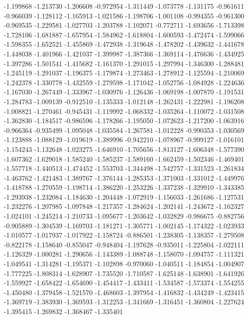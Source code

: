 -1.199868
-1.213730
-1.206608
-0.972954
-1.311449
-1.073778
-1.131175
-0.961611
-0.966039
-1.128112
-1.165913
-1.021586
-1.198706
-1.001108
-0.994355
-0.961300
-0.969535
-1.229581
-1.027703
-1.203788
-1.102071
-0.772711
-1.693656
-1.713398
-1.728106
-1.681887
-1.657954
-1.584962
-1.618804
-1.600593
-1.472474
-1.599066
-1.598355
-1.652521
-1.455869
-1.472938
-1.319648
-1.478202
-1.439632
-1.441678
-1.448038
-1.401966
-1.421037
-1.399987
-1.387366
-1.369114
-1.476636
-1.434925
-1.397286
-1.501541
-1.415682
-1.161370
-1.291015
-1.297994
-1.346300
-1.288481
-1.245119
-1.291037
-1.196375
-1.179874
-1.273463
-1.278912
-1.125594
-1.210069
-1.242378
-1.330778
-1.432559
-1.279598
-1.171042
-1.052756
-1.084928
-1.224636
-1.167030
-1.267449
-1.333967
-1.030976
-1.126436
-1.069198
-1.007870
-1.191531
-1.284783
-1.009139
-0.912510
-1.135333
-1.012148
-1.262431
-1.222981
-1.196208
-1.008821
-1.270461
-0.945431
-1.119992
-1.068332
-1.035264
-1.110072
-1.031508
-1.362830
-1.184517
-0.986596
-1.178266
-1.195050
-1.072623
-1.217200
-1.063916
-0.966364
-0.935499
-1.095048
-1.035584
-1.267581
-1.012228
-0.990353
-1.030569
-1.123888
-1.088129
-1.019619
-1.389996
-0.942210
-1.078967
-0.999127
-1.016101
-1.154243
-1.132648
-1.023275
-1.646910
-1.705656
-1.813127
-1.606348
-1.577390
-1.607362
-1.629018
-1.585240
-1.585237
-1.589160
-1.662459
-1.502346
-1.469401
-1.557718
-1.440513
-1.474452
-1.553703
-1.344498
-1.542757
-1.331523
-1.261834
-1.463762
-1.421483
-1.389767
-1.376144
-1.285353
-1.371003
-1.331012
-1.449976
-1.418788
-1.270559
-1.198714
-1.386220
-1.253226
-1.337238
-1.329910
-1.343385
-1.293938
-1.232084
-1.184630
-1.204448
-1.072919
-1.156033
-1.261686
-1.127531
-1.232276
-1.207985
-1.097848
-1.217357
-1.284624
-1.202141
-1.243672
-1.162327
-1.024101
-1.245214
-1.210733
-1.095677
-1.203642
-1.032829
-0.986675
-0.882756
-0.905889
-1.304539
-1.169703
-1.181271
-1.305771
-1.002145
-1.174322
-1.023933
-1.010577
-1.017937
-1.017922
-1.158724
-0.886501
-1.238305
-1.138357
-1.279508
-0.822178
-1.158640
-0.855047
-0.948404
-1.197628
-0.935011
-1.225804
-1.022111
-1.126329
-1.000281
-1.290656
-1.143389
-1.088748
-1.158070
-1.094757
-1.111321
-1.049541
-1.314281
-1.195371
-1.102898
-0.970060
-1.040511
-1.184854
-1.004907
-1.777225
-1.808314
-1.628907
-1.735520
-1.710587
-1.625148
-1.638901
-1.641926
-1.559927
-1.658422
-1.654690
-1.454417
-1.433411
-1.534587
-1.573374
-1.554255
-1.450480
-1.379458
-1.521570
-1.468603
-1.397954
-1.416832
-1.434249
-1.423415
-1.369719
-1.383930
-1.369593
-1.312253
-1.341669
-1.316451
-1.360804
-1.227624
-1.395415
-1.269832
-1.368467
-1.335401
